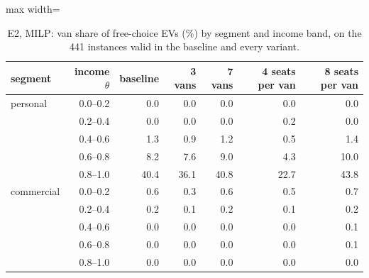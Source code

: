 \begin{table}[H]\centering
\small
\caption{E2, MILP: van share of free-choice EVs (\%) by segment and income band, on the 441 instances valid in the baseline and every variant.}\label{tab:bandE2}
\begin{adjustbox}{max width=\textwidth}\begin{tabular}{lrrrrrr}\toprule
segment & income $\theta$ & baseline & 3 vans & 7 vans & 4 seats per van & 8 seats per van \\ \midrule
personal & 0.0--0.2 & 0.0 & 0.0 & 0.0 & 0.0 & 0.0 \\
 & 0.2--0.4 & 0.0 & 0.0 & 0.0 & 0.2 & 0.0 \\
 & 0.4--0.6 & 1.3 & 0.9 & 1.2 & 0.5 & 1.4 \\
 & 0.6--0.8 & 8.2 & 7.6 & 9.0 & 4.3 & 10.0 \\
 & 0.8--1.0 & 40.4 & 36.1 & 40.8 & 22.7 & 43.8 \\
commercial & 0.0--0.2 & 0.6 & 0.3 & 0.6 & 0.5 & 0.7 \\
 & 0.2--0.4 & 0.2 & 0.1 & 0.2 & 0.1 & 0.2 \\
 & 0.4--0.6 & 0.0 & 0.0 & 0.0 & 0.0 & 0.1 \\
 & 0.6--0.8 & 0.0 & 0.0 & 0.0 & 0.0 & 0.1 \\
 & 0.8--1.0 & 0.0 & 0.0 & 0.0 & 0.0 & 0.0 \\
\bottomrule\end{tabular}\end{adjustbox}\end{table}
